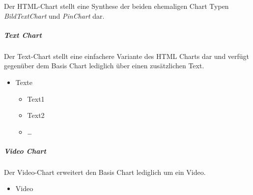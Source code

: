 \documentclass[a4paper]{article}
\begin{document}
	Der HTML-Chart stellt eine Synthese der beiden ehemaligen Chart Typen \emph{BildTextChart} und \emph{PinChart} dar.
	\subparagraph{Text Chart}
	Der Text-Chart stellt eine einfachere Variante des HTML Charts dar und verfügt gegenüber dem Basis Chart lediglich über einen zusätzlichen Text.
	\begin{itemize}
	\item Texte
		\begin{itemize}
		\item Text1
		\item Text2
		\item …
		\end{itemize}
	\end{itemize}
	\subparagraph{Video Chart}
	Der Video-Chart erweitert den Basis Chart lediglich um ein Video.
	\begin{itemize}
	\item Video
	\end{itemize}
\end{document}
